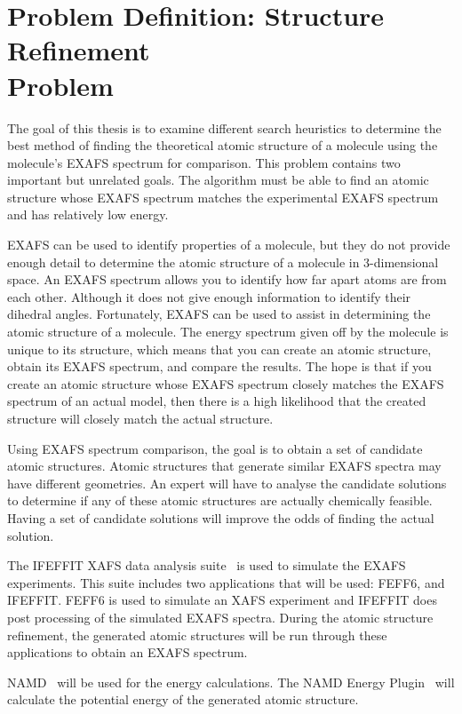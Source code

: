 \section[Problem Definition: Structure Refinement Problem]{Problem Definition: Structure Refinement\\ Problem}
\label{sec:problem-definition}

The goal of this thesis is to examine different search heuristics to determine the best method of finding the theoretical atomic structure of a molecule using the molecule's EXAFS spectrum for comparison. This problem contains two important but unrelated goals. The algorithm must be able to find an atomic structure whose EXAFS spectrum matches the experimental EXAFS spectrum and has relatively low energy.

EXAFS can be used to identify properties of a molecule, but they do not provide enough detail to determine the atomic structure of a molecule in 3-dimensional space. An EXAFS spectrum allows you to identify how far apart atoms are from each other. Although it does not give enough information to identify their dihedral angles. Fortunately, EXAFS can be used to assist in determining the atomic structure of a molecule. The energy spectrum given off by the molecule is unique to its structure, which means that you can create an atomic structure, obtain its EXAFS spectrum, and compare the results. The hope is that if you create an atomic structure whose EXAFS spectrum closely matches the EXAFS spectrum of an actual model, then there is a high likelihood that the created structure will closely match the actual structure.

Using EXAFS spectrum comparison, the goal is to obtain a set of candidate atomic structures. Atomic structures that generate similar EXAFS spectra may have different geometries. An expert will have to analyse the candidate solutions to determine if any of these atomic structures are actually chemically feasible. Having a set of candidate solutions will improve the odds of finding the actual solution.

The IFEFFIT XAFS data analysis suite~\cite{ifeffit} is used to simulate the EXAFS experiments. This suite includes two applications that will be used: FEFF6, and IFEFFIT. FEFF6 is used to simulate an XAFS experiment and IFEFFIT does post processing of the simulated EXAFS spectra. During the atomic structure refinement, the generated atomic structures will be run through these applications to obtain an EXAFS spectrum.

NAMD~\cite{namd} will be used for the energy calculations. The NAMD Energy Plugin~\cite{namdEnergy}  will calculate the potential energy of the generated atomic structure.

